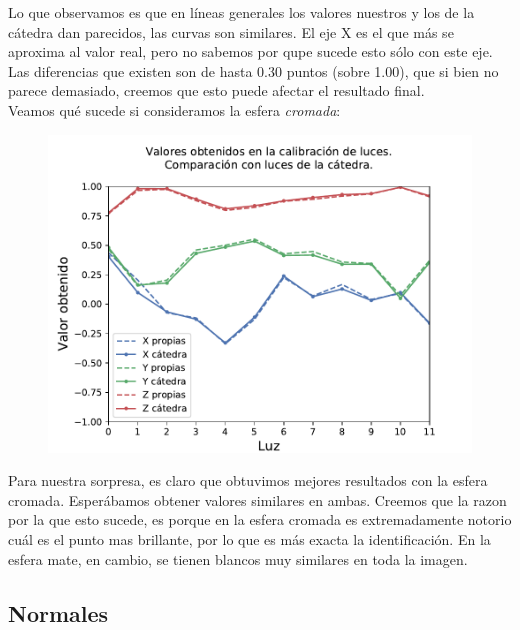 Lo que observamos es que en líneas generales los valores nuestros y los de la cátedra dan parecidos, las curvas son similares. El eje X es el que más se aproxima al valor real, pero no sabemos por qupe sucede esto sólo con este eje. Las diferencias que existen son de hasta 0.30 puntos (sobre 1.00), que si bien no parece demasiado, creemos que esto puede afectar el resultado final. \\

Veamos qué sucede si consideramos la esfera \textit{cromada}:

{\centering
\begin{figure}[H]
\centering
    \includegraphics[scale=0.80]{informe/imagenes/lucesComparacionFinal.pdf}
    \end{figure}
}

Para nuestra sorpresa, es claro que obtuvimos mejores resultados con la esfera cromada. Esperábamos obtener valores similares en ambas. Creemos que la razon por la que esto sucede, es porque en la esfera cromada es extremadamente notorio cuál es el punto mas brillante, por lo que es más exacta la identificación. En la esfera mate, en cambio, se tienen blancos muy similares en toda la imagen. \\

\newpage
\subsection{Normales}

